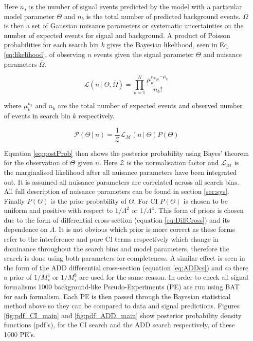    Here $n_{s}$ is the number of signal events predicted by the model with a particular model parameter $\Theta$ and $n_{b}$ is the total number of predicted background events. $\overline{\Omega}$ is then a set of Gaussian nuisance parameters or systematic uncertainties on the number of expected events for signal and background. A product of Poisson probabilities for each search bin $k$ gives the Bayesian likelihood, seen in Eq. \ref{eq:likelihood}, of observing $n$ events given the signal parameter $\Theta$ and nuisance parameters $\overline{\Omega}$.

	\begin{equation}
		\mathcal{L}(n~|~\Theta,\overline{\Omega}) = \prod\limits^{N}_{k=1}{\frac{\mu^{n_{k}}_{k} e^{-\mu_{k}}}{n_{k}!}}
    	\label{eq:likelihood}
    \end{equation}

    where $\mu^{n_{k}}_{k}$ and $n_{k}$ are the total number of expected events and observed number of events in search bin $k$ respectively. 


	\begin{equation}
		\mathcal{P}(\Theta~|~n) = \frac{1}{\mathcal{Z}}\mathcal{L}_{\mathcal{M}}(n~|~\Theta)P(\Theta)
    	\label{eq:postProb}
    \end{equation}

    Equation \ref{eq:postProb} then shows the posterior probability using Bayes' theorem for the observation of $\Theta$ given $n$. Here $\mathcal{Z}$ is the normalisation factor and $\mathcal{L}_{\mathcal{M}}$ is the marginalised likelihood after all nuisance parameters have been integrated out. It is assumed all nuisance parameters are correlated across all search bins. All full description of nuisance parameters can be found in section \ref{sec:sys}. Finally $P(\Theta)$ is the prior probability of $\Theta$. For CI $P(\Theta)$ is chosen to be uniform and positive with respect to $1/\Lambda^{2}$ or $1/\Lambda^{4}$. This form of priors is chosen due to the form of differential cross-section (equation \ref{eq:DiffCross}) and its dependence on $\Lambda$. It is not obvious which prior is more correct as these forms refer to the interference and pure CI terms respectively which change in dominance throughout the search bins and model parameters, therefore the search is done using both parameters for completeness. A similar effect is seen in the form of the ADD differential cross-section (equation \ref{eq:ADDcs}) and so there a prior of $1/M_{s}^{4}$ or $1/M_{s}^{8}$ are used for the same reason. In order to check all signal formalisms 1000 background-like Pseudo-Experiments (PE) are run using BAT for each formalism. Each PE is then passed through the Bayesian statistical method above so they can be compared to data and signal predictions. Figures \ref{fig:pdf_CI_main} and \ref{fig:pdf_ADD_main} show posterior probability density functions (pdf's), for the CI search and the ADD search respectively, of these 1000 PE's. 

